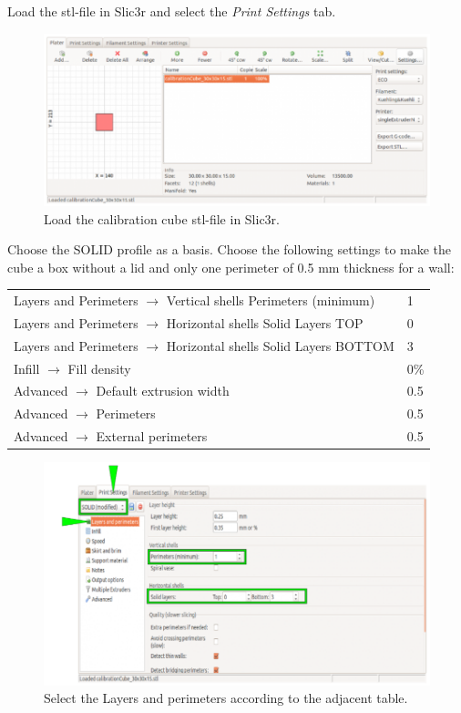Load the stl-file in Slic3r and select the \emph{Print Settings} tab.

\begin{figure}[H]
  \centering
  \includegraphics[width=.7\linewidth]{./img/slic3r_selectpartsettings_2.png}
  \caption{Load the calibration cube stl-file in Slic3r.}
\end{figure}

Choose the SOLID profile as a basis.
Choose the following settings to make the cube a box without a lid and only one perimeter of 0.5 mm thickness for a wall: 

\begin{table}[H]
  \centering
  \begin{tabular}{ l l }
    \toprule
    Layers and Perimeters $\rightarrow$ Vertical shells
    Perimeters (minimum) 
      & 1    \\
    Layers and Perimeters $\rightarrow$ Horizontal shells
    Solid Layers TOP 
      & 0    \\
    Layers and Perimeters $\rightarrow$ Horizontal shells
    Solid Layers BOTTOM 
      & 3    \\
    Infill $\rightarrow$ Fill density 
      & 0\%  \\
    Advanced $\rightarrow$ Default extrusion width  
      & 0.5  \\
    Advanced $\rightarrow$ Perimeters
      & 0.5  \\
    Advanced $\rightarrow$ External perimeters
      & 0.5  \\
    \bottomrule
  \end{tabular}
\end{table}

\begin{figure}[H]
  \centering
  \includegraphics[width=.7\linewidth]{./img/slic3r_selectprintsettings_calibrateextrusion.png}
  \caption{Select the Layers and perimeters according to the adjacent table.}
\end{figure}

